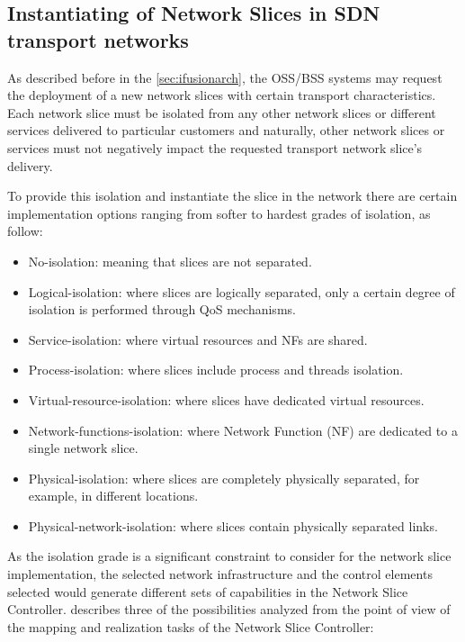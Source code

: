 \documentclass[journal,article,submit,moreauthors,pdftex]{Definitions/mdpi}
\begin{document}
\subsection{Instantiating of Network Slices in SDN transport networks}
\label{sec:instantiation}

As described before in the \cref{sec:ifusionarch}, the OSS/BSS systems may request the deployment of a new network slices with certain transport characteristics. Each network slice must be isolated from any other network slices or different services delivered to particular customers and naturally, other network slices or services must not negatively impact the requested transport network slice's delivery. 

To provide this isolation and instantiate the slice in the network there are certain implementation options ranging from softer to hardest grades of isolation, as follow:  

\begin{itemize}
    \item No-isolation: meaning that slices are not separated.
    \item Logical-isolation: where slices are logically separated, only a certain degree of isolation is performed through QoS mechanisms.
    \item Service-isolation: where virtual resources and NFs are shared.
    \item Process-isolation: where slices include process and threads isolation. 
    \item Virtual-resource-isolation: where slices have dedicated virtual resources.
     \item Network-functions-isolation: where Network Function (NF) are dedicated to a single network slice.   
    \item Physical-isolation: where slices are completely physically separated, for example, in different locations.
    \item Physical-network-isolation: where slices contain physically separated links. 
\end{itemize}

As the isolation grade is a significant constraint to consider for the network slice implementation, the selected network infrastructure and the control elements selected would generate different sets of capabilities in the Network Slice Controller.  describes three of the possibilities analyzed from the point of view of the mapping and realization tasks of the Network Slice Controller:
\end{document}
